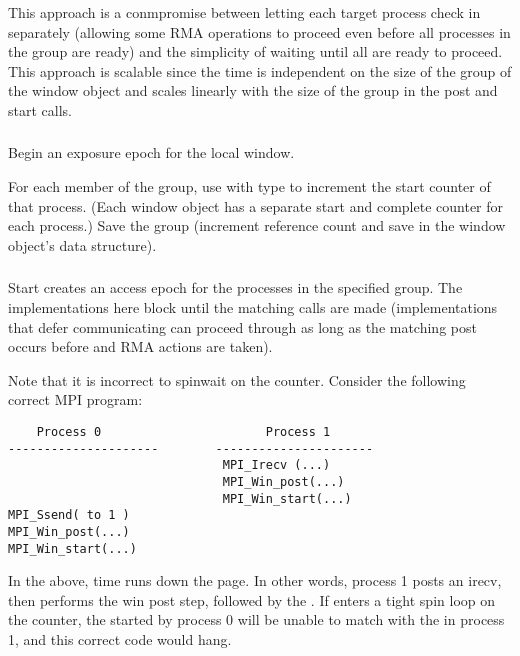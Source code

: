 \documentclass{article}
\begin{document}
This approach is a conmpromise between letting each target process check in
separately (allowing some RMA operations to proceed even before all processes
in the group are ready) and the simplicity of waiting until all are ready to
proceed.  This approach is scalable since the time is independent on the size
of the group of the window object and scales linearly with the size of the
group in the post and start calls.  



\subsubsection{}
Begin an exposure epoch for the local window.

For each member of the group, use  with type
 to increment the start counter of that
process.  (Each window object has a separate start and complete counter for
each process.)
Save the group (increment reference count and save in the window object's data structure).


\subsubsection{}
Start creates an access epoch for the processes in the specified group.  The
implementations here block until the matching  calls are
made (implementations that defer communicating can proceed through
 as long as the matching post occurs before and RMA
actions are taken).

Note that it is incorrect to spinwait on the counter.  Consider the following
correct MPI program:
\begin{verbatim}
    Process 0                       Process 1
---------------------        ----------------------
                              MPI_Irecv (...)
                              MPI_Win_post(...)
                              MPI_Win_start(...)
MPI_Ssend( to 1 )
MPI_Win_post(...)
MPI_Win_start(...)
\end{verbatim}
In the above, time runs down the page.  In other words, process 1 posts an
irecv, then performs the win post step, followed by the
.  If  enters a tight spin loop
on the counter, the  started by process 0 will be unable to
match with the  in process 1, and this correct code would
hang.  
\end{document}
